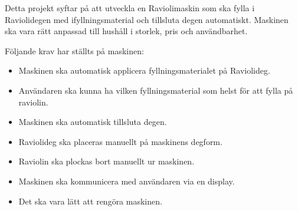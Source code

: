Detta projekt syftar på att utveckla en Raviolimaskin som ska fylla i Raviolidegen med ifyllningsmaterial och tillsluta degen automatiskt. Maskinen ska vara rätt anpassad till hushåll i storlek, pris och användbarhet.

Följande krav har ställts på maskinen:

\begin{itemize}
	\item Maskinen ska automatisk applicera fyllningsmaterialet på Raviolideg. 
	\item Användaren ska kunna ha vilken fyllningsmaterial som helst för att fylla på raviolin.
	\item Maskinen ska automatisk tillsluta degen.
	\item Raviolideg ska placeras manuellt på maskinens degform.
	\item Raviolin ska plockas bort manuellt ur maskinen.
	\item Maskinen ska kommunicera med användaren via en display.
	\item Det ska vara lätt att rengöra maskinen.	
\end{itemize}